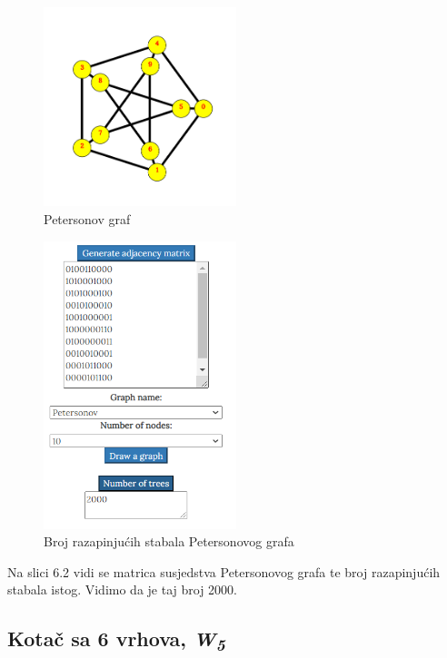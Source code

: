 \documentclass[times, utf8, zavrsni]{fer}
\begin{document}
\begin{figure}[htb]
	\centering
	\includegraphics[width=0.5\textwidth]{slike/petersonov.png}
	\caption{Petersonov graf}
	\label{fig:petersonov}
\end{figure}

\begin{figure}[htb]
	\centering
	\includegraphics[width=0.5\textwidth]{slike/petersonovbroj.png}
	\caption{Broj razapinjućih stabala Petersonovog grafa}
	\label{fig:petersonov-broj}
\end{figure}

Na slici 6.2 vidi se matrica susjedstva Petersonovog grafa te broj razapinjućih stabala istog. Vidimo da je taj broj 2000.

\subsection{Kotač sa 6 vrhova, \textit{W\textsubscript{5}}}
\end{document}
